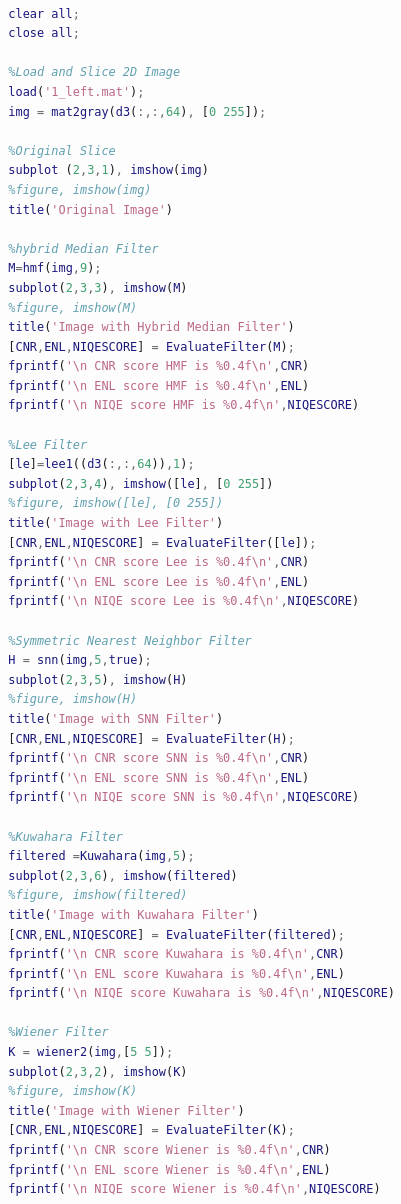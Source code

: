 \documentclass[%
reprint,
showpacs,preprintnumbers,
bibnotes,
amsmath,amssymb,
aps,
pra,
]{revtex4-1}
\begin{document}
\noindent\begin{minipage}{.9\textwidth}
\begin{lstlisting}[language=Matlab, caption=Script to Generate Figure of Filtered Images and Print Quality Metrics, label=code:Allcoding]
  %Script to Open and Slice an OCT Image, Apply Filtering, and Print Quality Metrics

  clear all;
  close all;

  %Load and Slice 2D Image
  load('1_left.mat');
  img = mat2gray(d3(:,:,64), [0 255]);

  %Original Slice
  subplot (2,3,1), imshow(img)
  %figure, imshow(img)
  title('Original Image')

  %hybrid Median Filter
  M=hmf(img,9);
  subplot(2,3,3), imshow(M)
  %figure, imshow(M)
  title('Image with Hybrid Median Filter')
  [CNR,ENL,NIQESCORE] = EvaluateFilter(M);
  fprintf('\n CNR score HMF is %0.4f\n',CNR)
  fprintf('\n ENL score HMF is %0.4f\n',ENL)
  fprintf('\n NIQE score HMF is %0.4f\n',NIQESCORE)

  %Lee Filter
  [le]=lee1((d3(:,:,64)),1);
  subplot(2,3,4), imshow([le], [0 255])
  %figure, imshow([le], [0 255])
  title('Image with Lee Filter')
  [CNR,ENL,NIQESCORE] = EvaluateFilter([le]);
  fprintf('\n CNR score Lee is %0.4f\n',CNR)
  fprintf('\n ENL score Lee is %0.4f\n',ENL)
  fprintf('\n NIQE score Lee is %0.4f\n',NIQESCORE)

  %Symmetric Nearest Neighbor Filter
  H = snn(img,5,true);
  subplot(2,3,5), imshow(H)
  %figure, imshow(H)
  title('Image with SNN Filter')
  [CNR,ENL,NIQESCORE] = EvaluateFilter(H);
  fprintf('\n CNR score SNN is %0.4f\n',CNR)
  fprintf('\n ENL score SNN is %0.4f\n',ENL)
  fprintf('\n NIQE score SNN is %0.4f\n',NIQESCORE)

  %Kuwahara Filter
  filtered =Kuwahara(img,5);
  subplot(2,3,6), imshow(filtered)
  %figure, imshow(filtered)
  title('Image with Kuwahara Filter')
  [CNR,ENL,NIQESCORE] = EvaluateFilter(filtered);
  fprintf('\n CNR score Kuwahara is %0.4f\n',CNR)
  fprintf('\n ENL score Kuwahara is %0.4f\n',ENL)
  fprintf('\n NIQE score Kuwahara is %0.4f\n',NIQESCORE)

  %Wiener Filter
  K = wiener2(img,[5 5]);
  subplot(2,3,2), imshow(K)
  %figure, imshow(K)
  title('Image with Wiener Filter')
  [CNR,ENL,NIQESCORE] = EvaluateFilter(K);
  fprintf('\n CNR score Wiener is %0.4f\n',CNR)
  fprintf('\n ENL score Wiener is %0.4f\n',ENL)
  fprintf('\n NIQE score Wiener is %0.4f\n',NIQESCORE)
\end{lstlisting}
\end{minipage}

  \clearpage
	
	\show\tableofcontents
	\show\lstlistoflistings
	\show\listoftables
	\show\listoffigures
\end{document}
